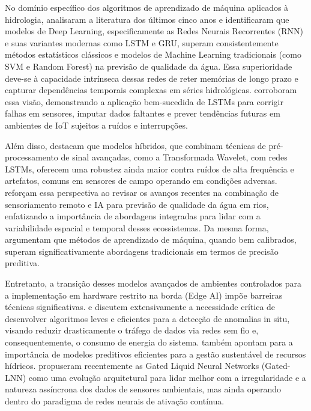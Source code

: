 \documentclass[twoside]{article}
\begin{document}
No domínio específico dos algoritmos de aprendizado de máquina aplicados
à hidrologia,  analisaram a literatura dos últimos cinco
anos e identificaram que modelos de Deep Learning, especificamente as
Redes Neurais Recorrentes (RNN) e suas variantes modernas como LSTM e GRU,
superam consistentemente métodos estatísticos clássicos e modelos de
Machine Learning tradicionais (como SVM e Random Forest) na previsão de
qualidade da água. Essa superioridade deve-se à capacidade intrínseca dessas
redes de reter memórias de longo prazo e capturar dependências temporais complexas
em séries hidrológicas.  corroboram essa visão, demonstrando a
aplicação bem-sucedida de LSTMs para corrigir falhas em sensores, imputar dados
faltantes e prever tendências futuras em ambientes de IoT sujeitos a ruídos e
interrupções.

Além disso,  destacam que modelos híbridos, que
combinam técnicas de pré-processamento de sinal avançadas, como a
Transformada Wavelet, com redes LSTMs, oferecem uma robustez ainda maior
contra ruídos de alta frequência e artefatos, comuns em sensores de campo
operando em condições adversas.
 reforçam essa perspectiva ao revisar os avanços recentes
na combinação de sensoriamento remoto e IA para previsão de qualidade da
água em rios, enfatizando a importância de abordagens integradas para
lidar com a variabilidade espacial e temporal desses ecossistemas.
Da mesma forma,  argumentam que métodos de aprendizado
de máquina, quando bem calibrados, superam significativamente abordagens
tradicionais em termos de precisão preditiva.

Entretanto, a transição desses modelos avançados de ambientes controlados
para a implementação em hardware restrito na borda (Edge AI) impõe
barreiras técnicas significativas.
 e  discutem extensivamente
a necessidade crítica de desenvolver algoritmos leves e eficientes para a
detecção de anomalias in situ, visando reduzir drasticamente o tráfego de
dados via redes sem fio e, consequentemente, o consumo de energia do
sistema.
 também apontam para a importância de modelos
preditivos eficientes para a gestão sustentável de recursos hídricos.
 propuseram recentemente as Gated Liquid Neural
Networks (Gated-LNN) como uma evolução arquitetural para lidar melhor com
a irregularidade e a natureza assíncrona dos dados de sensores
ambientais, mas ainda operando dentro do paradigma de redes neurais de
ativação contínua.
\end{document}
